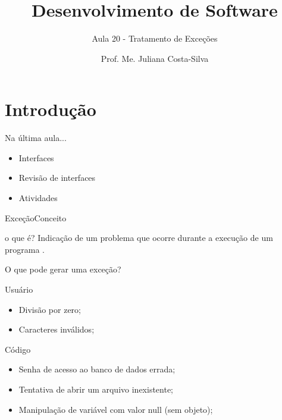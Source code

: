 \documentclass[11pt,aspectratio=43,ignorenonframetext,t]{beamer}
\title{Desenvolvimento de Software}
\subtitle{Aula 20 - Tratamento de Exceções}
\author{Prof. Me. Juliana Costa-Silva}
\begin{document}
\maketitle


\section{Introdução}
\begin{frame}{Na última aula...}
 \begin{itemize}
  \item Interfaces 
  \item Revisão de interfaces
  \item Atividades 
 \end{itemize}
\end{frame}
\begin{frame}{Exceção}{Conceito}
  \begin{block}{o que é?}
      Indicação de um problema que ocorre durante a execução de um programa \cite{deitel2017java}.
  \end{block}

\end{frame}
\begin{frame}{O que pode gerar uma exceção?}
    \begin{block}{Usuário}
        \begin{itemize}
            \item Divisão por zero;
            \item Caracteres inválidos;
        \end{itemize}
    \end{block}
    \begin{block}{Código}
        \begin{itemize}
            \item Senha de acesso ao banco de dados errada;
            \item Tentativa de abrir um arquivo inexistente;
            \item Manipulação de variável com valor null (sem objeto);
        \end{itemize}
    \end{block} 
\end{frame}
\end{document}
